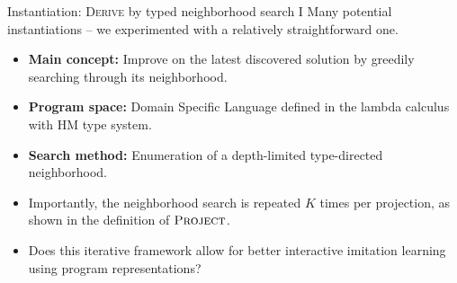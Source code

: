 \begin{frame}{Instantiation: \textsc{Derive} by typed neighborhood search I}
    Many potential instantiations -- we experimented with a relatively straightforward one.
    \begin{itemize}
        \item \textbf{Main concept:} Improve on the latest discovered solution by greedily searching through its neighborhood.
        \item \textbf{Program space:} Domain Specific Language defined in the lambda calculus with HM type system.
        \item \textbf{Search method:} Enumeration of a depth-limited type-directed neighborhood.
        \item Importantly, the neighborhood search is repeated $K$ times per projection, as shown in the definition of $\textsc{Project}$.
        \item Does this iterative framework allow for better interactive imitation learning using program representations?
    \end{itemize}
\end{frame}

